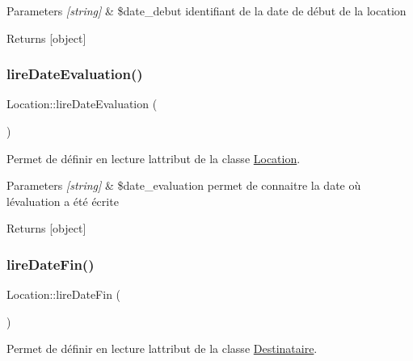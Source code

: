 \begin{DoxyParams}{Parameters}
{\em \mbox{[}string\mbox{]}} & \$date\+\_\+debut identifiant de la date de début de la location \\
\hline
\end{DoxyParams}
\begin{DoxyReturn}{Returns}
\mbox{[}object\mbox{]} 
\end{DoxyReturn}
\mbox{\label{class_location_ab38a7d65891f8d40a4142878e1d9c8f9}} 
\subsubsection{\texorpdfstring{lire\+Date\+Evaluation()}{lireDateEvaluation()}}
{\footnotesize\ttfamily Location\+::lire\+Date\+Evaluation (\begin{DoxyParamCaption}{ }\end{DoxyParamCaption})}



Permet de définir en lecture l\textquotesingle{}attribut de la classe \hyperlink{class_location}{Location}. 


\begin{DoxyParams}{Parameters}
{\em \mbox{[}string\mbox{]}} & \$date\+\_\+evaluation permet de connaitre la date où l\textquotesingle{}évaluation a été écrite \\
\hline
\end{DoxyParams}
\begin{DoxyReturn}{Returns}
\mbox{[}object\mbox{]} 
\end{DoxyReturn}
\mbox{\label{class_location_a6ca6f5b4b4b49d0f27b46a7fff3a476c}} 
\subsubsection{\texorpdfstring{lire\+Date\+Fin()}{lireDateFin()}}
{\footnotesize\ttfamily Location\+::lire\+Date\+Fin (\begin{DoxyParamCaption}{ }\end{DoxyParamCaption})}



Permet de définir en lecture l\textquotesingle{}attribut de la classe \hyperlink{class_destinataire}{Destinataire}. 


